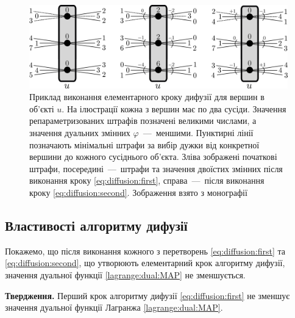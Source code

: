 \begin{figure}[h]
  \centering
  \includegraphics[width=\textwidth]{images/diffusion_step}
  \caption{Приклад виконання елементарного кроку дифузії для вершин в об'єкті $u$.
           На ілюстрації кожна з вершин має по два сусіди.
           Значення репараметризованих штрафів позначені великими числами,
           а значення дуальних змінних $\varphi$~---~меншими.
           Пунктирні лінії позначають мінімальні штрафи за вибір
           дужки від конкретної вершини до кожного сусіднього об'єкта.
           Зліва зображені початкові штрафи,
           посередині~---~штрафи та значення
           двоїстих змінних після виконання кроку \eqref{eq:diffusion:first},
           справа~---~після виконання кроку \eqref{eq:diffusion:second}.
           Зображення взято з монографії \cite{overview:savchynskyy:diffusion}}
  \label{fig:diffusion:step}
\end{figure}

\subsection{Властивості алгоритму дифузії}

Покажемо, що після виконання кожного з перетворень \eqref{eq:diffusion:first}
та \eqref{eq:diffusion:second},
що утворюють елементарний крок алгоритму дифузії,
значення дуальної функції \eqref{lagrange:dual:MAP} не зменшується.

\textbf{Твердження.}
Перший крок алгоритму дифузії \eqref{eq:diffusion:first}
не зменшує значення дуальної функції Лагранжа \eqref{lagrange:dual:MAP}.

